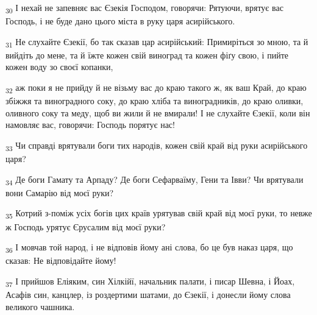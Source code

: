 \begin{tcolorbox}
\textsubscript{30} І нехай не запевняє вас Єзекія Господом, говорячи: Рятуючи, врятує вас Господь, і не буде дано цього міста в руку царя асирійського.
\end{tcolorbox}
\begin{tcolorbox}
\textsubscript{31} Не слухайте Єзекії, бо так сказав цар асирійський: Примиріться зо мною, та й вийдіть до мене, та й їжте кожен свій виноград та кожен фіґу свою, і пийте кожен воду зо своєї копанки,
\end{tcolorbox}
\begin{tcolorbox}
\textsubscript{32} аж поки я не прийду й не візьму вас до краю такого ж, як ваш Край, до краю збіжжя та виноградного соку, до краю хліба та виноградників, до краю оливки, оливного соку та меду, щоб ви жили й не вмирали! І не слухайте Єзекії, коли він намовляє вас, говорячи: Господь порятує нас!
\end{tcolorbox}
\begin{tcolorbox}
\textsubscript{33} Чи справді врятували боги тих народів, кожен свій край від руки асирійського царя?
\end{tcolorbox}
\begin{tcolorbox}
\textsubscript{34} Де боги Гамату та Арпаду? Де боги Сефарваїму, Гени та Івви? Чи врятували вони Самарію від моєї руки?
\end{tcolorbox}
\begin{tcolorbox}
\textsubscript{35} Котрий з-поміж усіх богів цих країв урятував свій край від моєї руки, то невже ж Господь урятує Єрусалим від моєї руки?
\end{tcolorbox}
\begin{tcolorbox}
\textsubscript{36} І мовчав той народ, і не відповів йому ані слова, бо це був наказ царя, що сказав: Не відповідайте йому!
\end{tcolorbox}
\begin{tcolorbox}
\textsubscript{37} І прийшов Еліяким, син Хілкійї, начальник палати, і писар Шевна, і Йоах, Асафів син, канцлер, із роздертими шатами, до Єзекії, і донесли йому слова великого чашника.
\end{tcolorbox}
